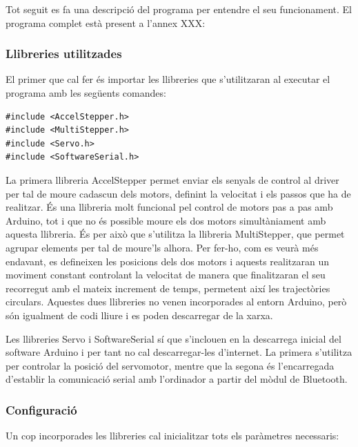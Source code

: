 Tot seguit es fa una descripció del programa per entendre el seu funcionament. El programa complet està present a l’annex XXX:

\subsubsection{Llibreries utilitzades}

El primer que cal fer és importar les llibreries que s’utilitzaran al executar el programa amb les següents comandes:
 
\begin{lstlisting}[style=Arduino]
#include <AccelStepper.h>
#include <MultiStepper.h>
#include <Servo.h>
#include <SoftwareSerial.h>
\end{lstlisting}

La primera llibreria AccelStepper permet enviar els senyals de control al driver per tal de moure cadascun dels motors, definint la velocitat i els passos que ha de realitzar. És una llibreria molt funcional pel control de motors pas a pas amb Arduino, tot i que no és possible moure els dos motors simultàniament amb aquesta llibreria. És per això que s’utilitza la llibreria MultiStepper, que permet agrupar elements per tal de moure’ls alhora. Per fer-ho, com es veurà més endavant, es defineixen les posicions dels dos motors i aquests realitzaran un moviment constant controlant la velocitat de manera que finalitzaran el seu recorregut amb el mateix increment de temps, permetent així les trajectòries circulars. Aquestes dues llibreries no venen incorporades al entorn Arduino, però són igualment de codi lliure i es poden descarregar de la xarxa.
 
Les llibreries Servo i SoftwareSerial sí que s’inclouen en la descarrega inicial del software Arduino i per tant no cal descarregar-les d’internet. La primera s’utilitza per controlar la posició del servomotor, mentre que la segona és l’encarregada d’establir la comunicació serial amb l’ordinador a partir del mòdul de Bluetooth. 

\subsubsection{Configuració}

Un cop incorporades les llibreries cal inicialitzar tots els paràmetres necessaris: 

